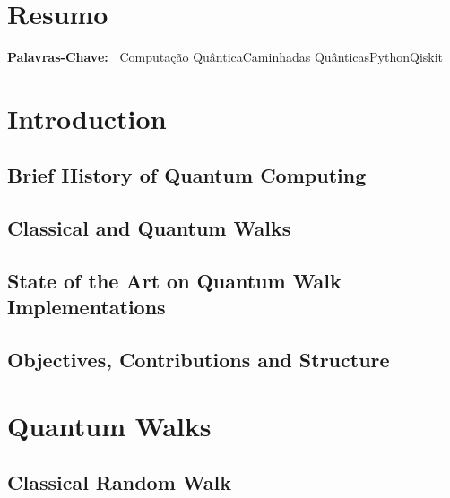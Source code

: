 \documentclass[
oneside,
11pt, a4paper,
footinclude=true,
headinclude=true,
cleardoublepage=empty
]{scrbook}
\newcommand\portuguesekeywordslabel{Palavras-Chave:}
\newcommand\portuguesekeywords[2]{%
  \begin{list}{}{%
    \setlength{\topsep}{2ex}%
    \settowidth{\leftmargin}{\bfseries\portuguesekeywordslabel~}%
    \setlength{\labelsep}{0pt}%
    \setlength{\labelwidth}{\leftmargin}%
    \setlength{\itemindent}{0pt}%
  }
  \raggedright\bfseries\item[\bfseries\portuguesekeywordslabel~]#1
  \end{list}
}
\begin{document}
\cleardoublepage
\chapter*{Resumo}

\portuguesekeywords{Computação Quântica\quad Caminhadas Quânticas\quad Python\quad Qiskit}

\tableofcontents
\listoffigures
\listoftables



\chapter{Introduction}\label{chap:introduction}

\section{Brief History of Quantum Computing}\label{sec:historyQC}

\section{Classical and Quantum Walks}\label{sec:classicalandquantumwalks}

\section{State of the Art on Quantum Walk Implementations}\label{sec:stateart}

\section{Objectives, Contributions and Structure}\label{sec:contrib}


\chapter{Quantum Walks}\label{chap:QuantumWalks}

\section{Classical Random Walk}\label{sec:chap3ClassicalWalk}

\end{document}
